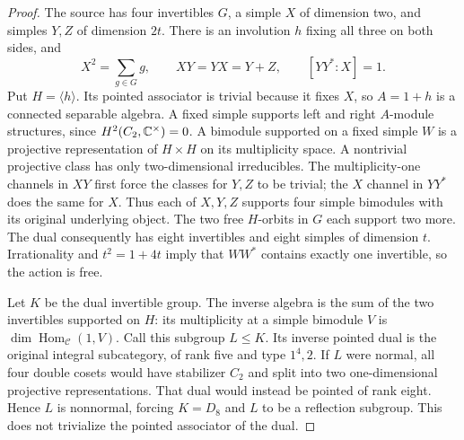 \begin{proof}
The source has four invertibles $G$, a simple $X$ of dimension two,
and simples $Y,Z$ of dimension $2t$. There is an involution $h$ fixing
all three on both sides, and
\[
 X^2=\sum_{g\in G}g,\qquad XY=YX=Y+Z,
 \qquad [YY^*:X]=1.
\]
Put $H=\langle h\rangle$. Its pointed associator is trivial because
it fixes $X$, so $A=1+h$ is a connected separable algebra. A fixed
simple supports left and right $A$-module structures, since
$H^2(C_2,\mathbb C^\times)=0$. A bimodule supported on a fixed simple $W$
is a projective representation of $H\times H$ on its multiplicity
space. A nontrivial projective class has only two-dimensional
irreducibles. The multiplicity-one channels in $XY$ first force the
classes for $Y,Z$ to be trivial; the $X$ channel in $YY^*$ does the
same for $X$. Thus each of $X,Y,Z$ supports four simple bimodules
with its original underlying object. The two free $H$-orbits in $G$
each support two more. The dual consequently has eight invertibles
and eight simples of dimension $t$. Irrationality and $t^2=1+4t$
imply that $WW^*$ contains exactly one invertible, so the action is free.

Let $K$ be the dual invertible group. The inverse algebra is the sum
of the two invertibles supported on $H$: its multiplicity at a simple
bimodule $V$ is $\dim\operatorname{Hom}_{\mathcal C}(1,V)$.
Call this subgroup $L\leq K$. Its inverse pointed dual is the original
integral subcategory, of rank five and type $1^4,2$.
If $L$ were normal, all four double cosets would have stabilizer $C_2$
and split into two one-dimensional projective representations. That
dual would instead be pointed of rank eight. Hence $L$ is nonnormal,
forcing $K=D_8$ and $L$ to be a reflection subgroup. This does not
trivialize the pointed associator of the dual.


\end{proof}
